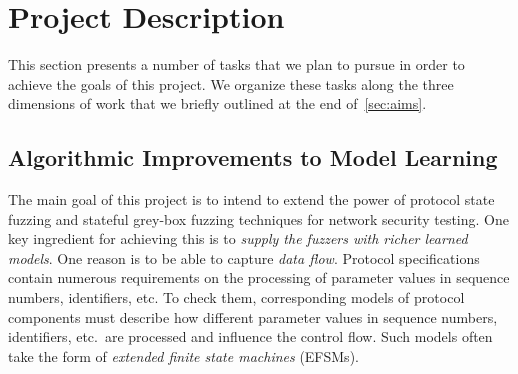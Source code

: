 \documentclass[11pt]{article}
\begin{document}
\section{Project Description} \label{sec:description}
This section presents a number of tasks that we plan to pursue in
order to achieve the goals of this project. We organize these tasks along the
three dimensions of work that we briefly outlined at the end of~\cref{sec:aims}.

\subsection{Algorithmic Improvements to Model Learning} \label{sec:algorithms}
%
The main goal of this project is to intend to extend the power of protocol
state fuzzing and stateful grey-box fuzzing techniques for network security
testing.
One key ingredient for achieving this is to \emph{supply the fuzzers with
richer learned models}. One reason is to be able to
capture \emph{data flow}. Protocol specifications
contain numerous requirements on the processing of parameter values in
sequence numbers, identifiers, etc. To check them, corresponding models of
protocol components must describe how different parameter values in sequence
numbers, identifiers, etc.\ are processed and influence the control flow.
Such models often take the form of \emph{extended finite state machines} (EFSMs).
\end{document}
